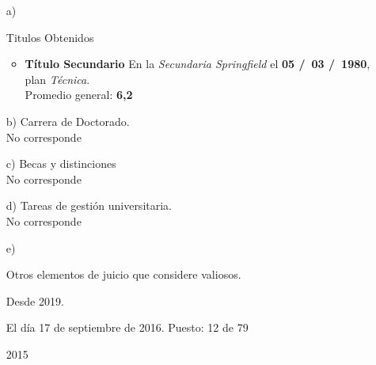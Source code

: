 \begin{enumerate}[leftmargin=0.8cm]

  \item[a)]{Titulos Obtenidos

    \begin{itemize}[leftmargin=0.2cm]

      \item {
        \textbf{Título Secundario}
        En la \emph{Secundaria Springfield} el \textbf{05 \slash \ 03 \slash \ 1980}, \\
        plan \emph{Técnica}. \\
        Promedio general: \textbf{6,2}
      }

    \end{itemize}

  }

  \item[b)]{Carrera de Doctorado.
    \\ No corresponde
  }

  \item[c)]{Becas y distinciones
    \\ No corresponde
  }

  \item[d)]{Tareas de gestión universitaria.
    \\ No corresponde
  }

  \item[e)]{Otros elementos de juicio que considere valiosos.

    \begin{itemize}[leftmargin=0.2cm]

      {}{Desde 2019.}{}

        {}
        {El día 17 de septiembre de 2016.}
        {Puesto: 12 de 79}

      {}{2015}{}

    \end{itemize}

  }

\end{enumerate}
